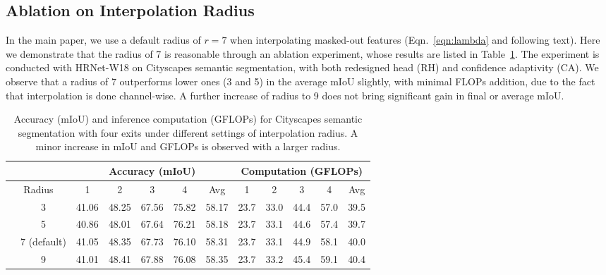 \subsection{Ablation on Interpolation Radius}
In the main paper, we use a default radius of $r=7$ when interpolating masked-out features (Eqn.~\ref{eqn:lambda} and following text). Here we demonstrate that the radius of 7 is reasonable through an ablation experiment, whose results are listed in Table~\ref{tab:radius}. The experiment is conducted with HRNet-W18 on Cityscapes semantic segmentation, with both redesigned head (RH) and confidence adaptivity (CA). We observe that a radius of 7 outperforms lower ones (3 and 5) in the average mIoU slightly, with minimal FLOPs addition, due to the fact that interpolation is done channel-wise. A further increase of radius to 9 does not bring significant gain in final or average mIoU.
\begin{table}[h]
\centering
\footnotesize
\begin{tabular}{cc|ccccc|ccccc}
\hline
\multicolumn{2}{c|}{}                            & \multicolumn{5}{c}{Accuracy (mIoU)}         & \multicolumn{5}{|c}{Computation (GFLOPs)}            \\ \hline
\multicolumn{2}{c|}{Radius}             & 1    & 2    & 3    & 4    & Avg  & 1     & 2     & 3     & 4      & Avg   \\ \hline
& 3 & 41.06 &   48.25 & 67.56 & 75.82  & 58.17  &  23.7 &  33.0 & 44.4 & 57.0 &   39.5  \\ 
& 5 & 40.86 &   48.01 & 67.64 & 76.21  & 58.18  &  23.7 & 33.1 & 44.6 & 57.4 &   39.7  \\ 
& 7 (default) & 41.05 & 48.35 & 67.73 & 76.10  & 58.31  & 23.7 & 33.1 & 44.9 & 58.1 &   40.0  \\ 
& 9 & 41.01 &   48.41 & 67.88 & 76.08 & 58.35  &  23.7 & 33.2 & 45.4 & 59.1 &   40.4  \\  \hline
\end{tabular}
\vspace{0ex}
\caption{%
Accuracy (mIoU) and inference computation (GFLOPs) for Cityscapes semantic segmentation with four exits under different settings of interpolation radius. A minor increase in mIoU and GFLOPs is observed with a larger radius.
}
\label{tab:radius}
\end{table}

